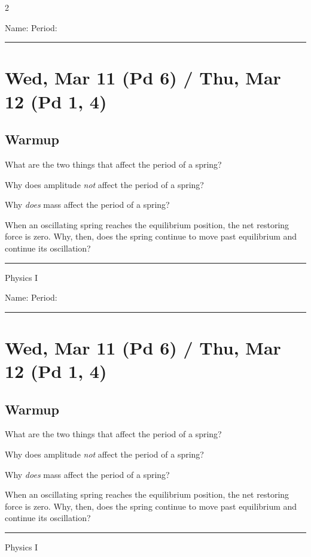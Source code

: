 \documentclass[10pt,landscape]{exam}
\def\todayDate{Wed, Mar 11 (Pd 6) / Thu, Mar 12 (Pd 1, 4)}
\def\content{
\begin{questions}
  \question
  What are the two things that affect the period of a spring?
  \vs

\question
  Why does amplitude \emph{not} affect the period of a spring?
  \vs

\question
  Why \emph{does} mass affect the period of a spring?
  \vs

\question
  When an oscillating spring reaches the equilibrium position, the net restoring force is zero.  Why, then, does the spring continue to move past equilibrium and continue its oscillation?
  \vs
\end{questions}
}
\begin{document}
\pagestyle{empty}

\setlength{\columnsep}{0.8in}
\begin{multicols*}{2}

\noindent  
Name: \hfill Period: \hspace{5em}
\vspace{0.5em}
\hrule

\section*{\todayDate}
\subsection*{Warmup}

\content

\vfill
\hrule
\vspace{0.5em}
\hfill {\sc Physics I}

\columnbreak

\noindent  
Name: \hfill Period: \hspace{5em}
\vspace{0.5em}
\hrule

\section*{\todayDate}
\subsection*{Warmup}

\content

\vfill
\hrule
\vspace{0.5em}
\hfill {\sc Physics I}

\end{multicols*}
\end{document}

